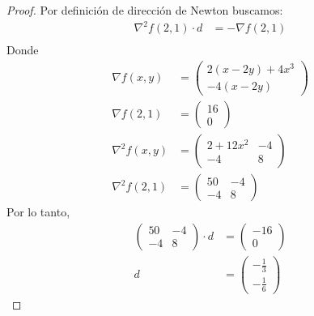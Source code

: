 \documentclass{article}
\begin{document}
\begin{proof}
    Por definición de dirección de Newton buscamos: \begin{align*}
        \nabla^2 f(2, 1) \cdot d & = - \nabla f(2, 1) \\
    \end{align*}
    Donde \begin{align*}
        \nabla f(x,y)   & = \begin{pmatrix}
                                2(x - 2y) + 4x^3 \\
                                -4(x - 2y)
                            \end{pmatrix} \\
        \nabla f(2,1)   & = \begin{pmatrix}
                                16 \\
                                0
                            \end{pmatrix}   \\
        \nabla^2 f(x,y) & = \begin{pmatrix}
                                2 + 12x^2 & -4 \\
                                -4        & 8
                            \end{pmatrix}   \\
        \nabla^2 f(2,1) & = \begin{pmatrix}
                                50 & -4 \\
                                -4 & 8
                            \end{pmatrix}
    \end{align*}
    Por lo tanto, \begin{align*}
        \begin{pmatrix}
            50 & -4 \\
            -4 & 8
        \end{pmatrix} \cdot d & = \begin{pmatrix}
                                      -16 \\
                                      0
                                  \end{pmatrix} \\
        d                     & = \begin{pmatrix}
                                      -\frac{1}{3} \\
                                      -\frac{1}{6}
                                  \end{pmatrix}

\end{align*}
\end{proof}
\end{document}
